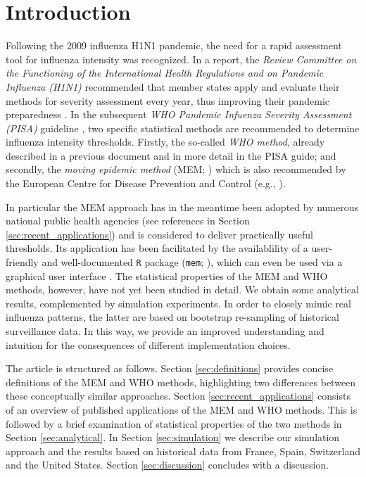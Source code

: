 \documentclass{article}
\begin{document}
\section{Introduction}

Following the 2009 influenza H1N1 pandemic, the need for a rapid assessment tool for influenza intensity was recognized. In a report, the \textit{Review Committee on the Functioning of the
International Health Regulations and on Pandemic Influenza (H1N1)} recommended that member states apply and evaluate their methods for severity assessment every year, thus improving their pandemic preparedness \citep[p.118]{WHO2011}. In the subsequent \textit{WHO Pandemic Infuenza Severity Assessment (PISA)} guideline \citep{WHO2017}, two specific statistical methods are recommended to determine influenza intensity thresholds. Firstly, the so-called \textit{WHO method}, already described in a previous document \citep{WHO2014} and in more detail in the PISA guide; and secondly, the \textit{moving epidemic method} (MEM; \citealt{Vega2013, Vega2015}) which is also recommended by the European Centre for Disease Prevention and Control (e.g., \citealt{ECDC2017}).

In particular the MEM approach has in the meantime been adopted by numerous national public health agencies (see references in Section \ref{sec:recent_applications}) and is considered to deliver practically useful thresholds. Its application has been facilitated by the availablility of a user-friendly and well-documented \texttt{R} package (\texttt{mem}; \citealt{Lozano2020}), which can even be used via a graphical user interface \citep{Lozano2018}. The statistical properties of the MEM and WHO methods, however, have not yet been studied in detail. We obtain some analytical results, complemented by simulation experiments. In order to closely mimic real influenza patterns, the latter are based on bootstrap re-sampling of historical surveillance data. In this way, we provide an improved understanding and intuition for the consequences of different implementation choices.

The article is structured as follows. Section \ref{sec:definitions} provides concise definitions of the MEM and WHO methods, highlighting two differences between these conceptually similar approaches. Section \ref{sec:recent_applications} consists of an overview of published applications of the MEM and WHO methods. This is followed by a brief examination of statistical properties of the two methods in Section \ref{sec:analytical}. In Section \ref{sec:simulation} we describe our simulation approach and the results based on historical data from France, Spain, Switzerland and the United States. Section \ref{sec:discussion} concludes with a discussion.
\end{document}
